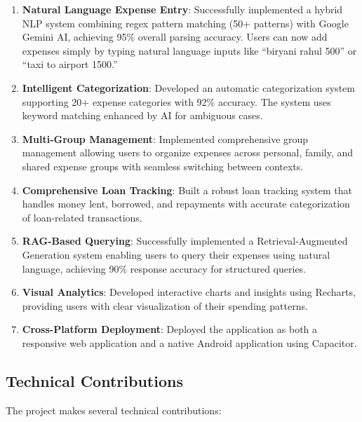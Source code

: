 \begin{enumerate}
    \item \textbf{Natural Language Expense Entry}: Successfully implemented a hybrid NLP system combining regex pattern matching (50+ patterns) with Google Gemini AI, achieving 95\% overall parsing accuracy. Users can now add expenses simply by typing natural language inputs like ``biryani rahul 500'' or ``taxi to airport 1500.''
    
    \item \textbf{Intelligent Categorization}: Developed an automatic categorization system supporting 20+ expense categories with 92\% accuracy. The system uses keyword matching enhanced by AI for ambiguous cases.
    
    \item \textbf{Multi-Group Management}: Implemented comprehensive group management allowing users to organize expenses across personal, family, and shared expense groups with seamless switching between contexts.
    
    \item \textbf{Comprehensive Loan Tracking}: Built a robust loan tracking system that handles money lent, borrowed, and repayments with accurate categorization of loan-related transactions.
    
    \item \textbf{RAG-Based Querying}: Successfully implemented a Retrieval-Augmented Generation system enabling users to query their expenses using natural language, achieving 90\% response accuracy for structured queries.
    
    \item \textbf{Visual Analytics}: Developed interactive charts and insights using Recharts, providing users with clear visualization of their spending patterns.
    
    \item \textbf{Cross-Platform Deployment}: Deployed the application as both a responsive web application and a native Android application using Capacitor.
\end{enumerate}

\subsection{Technical Contributions}

The project makes several technical contributions:

